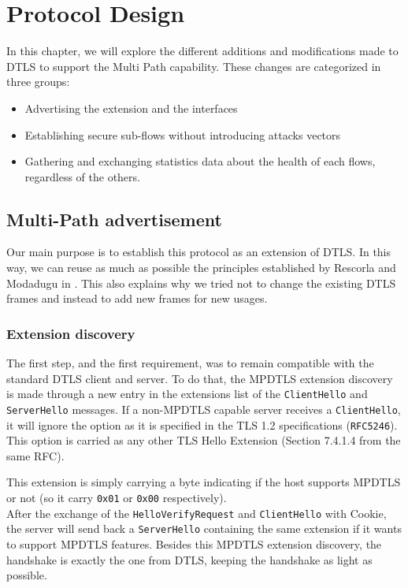 \chapter{Protocol Design}

In this chapter, we will explore the different additions and modifications made to DTLS to support the Multi Path capability. These changes are categorized in three groups:
\begin{itemize}
\item Advertising the extension and the interfaces
\item Establishing secure sub-flows without introducing attacks vectors
\item Gathering and exchanging statistics data about the health of each flows, regardless of the others. 
\end{itemize}


\section{Multi-Path advertisement}

Our main purpose is to establish this protocol as an extension of DTLS. In this way, we can reuse as much as possible the principles established by Rescorla and Modadugu in \cite{modadugu2004design}. This also explains why we tried not to change the existing DTLS frames and instead to add new frames for new usages.

\subsection{Extension discovery}

The first step, and the first requirement, was to remain compatible with the standard DTLS client and server. To do that, the MPDTLS extension discovery is made through a new entry in the extensions list of the \verb!ClientHello! and \verb!ServerHello! messages. If a non-MPDTLS capable server receives a \verb!ClientHello!, it will ignore the option  as it is specified in the TLS 1.2 specifications (\verb!RFC5246!\cite{rfc5246}). This option is carried as any other TLS Hello Extension (Section 7.4.1.4 from the same RFC).

This extension is simply carrying a byte indicating if the host supports MPDTLS or not (so it carry \verb!0x01! or \verb!0x00! respectively).\\

After the exchange of the \verb!HelloVerifyRequest! and \verb!ClientHello! with Cookie, the server will send back a \verb!ServerHello! containing the same extension if it wants to support MPDTLS features. Besides this MPDTLS extension discovery, the handshake is exactly the one from DTLS, keeping the handshake as light as possible.

